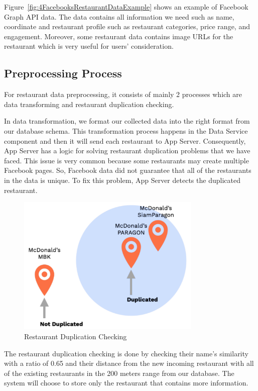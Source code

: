 \documentclass[12pt,oneside,openright,a4paper]{cpe-english-project}
\begin{document}
Figure~\ref{fig:4FacebooksRestaurantDataExample} shows an example of Facebook Graph API data. The data contains all information we need such as name, coordinate and restaurant profile such as restaurant categories, price range, and engagement. Moreover, some restaurant data contains image URLs for the restaurant which is very useful for users’ consideration.

\subsection{Preprocessing Process}

For restaurant data preprocessing, it consists of mainly 2 processes which are data transforming and restaurant duplication checking.

In data transformation, we format our collected data into the right format from our database schema. This transformation process happens in the Data Service component and then it will send each restaurant to App Server. Consequently, App Server has a logic for solving restaurant duplication problems that we have faced. This issue is very common because some restaurants may create multiple Facebook pages. So, Facebook data did not guarantee that all of the restaurants in the data is unique. To fix this problem, App Server detects the duplicated restaurant.

\newpage
\begin{figure}[H]\centering
\includegraphics[width=250pt]{./images/4RestaurantDuplicationChecking.png}
\caption{Restaurant Duplication Checking}\label{fig:4RestaurantDuplicationChecking}
\end{figure}

The restaurant duplication checking is done by checking their name’s similarity with a ratio of 0.65 and their distance from the new incoming restaurant with all of the existing restaurants in the 200 meters range from our database. The system will choose to store only the restaurant that contains more information.
\end{document}
